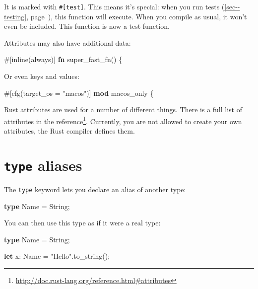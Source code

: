 \documentclass[a4paper,]{book}
\renewcommand*{\hypertarget}[3][\ar]{%
  \def\ar{#2}%
  \label{#1}%
  #3}
\renewcommand*{\hyperlink}[2]{%
 #2 (\autoref{#1}, page~\pageref{#1})}
\newenvironment{Shaded}{\begin{snugshade}}{\end{snugshade}}
\newcommand{\KeywordTok}[1]{\textcolor[rgb]{0.13,0.29,0.53}{\textbf{{#1}}}}
\newcommand{\DataTypeTok}[1]{\textcolor[rgb]{0.13,0.29,0.53}{{#1}}}
\newcommand{\StringTok}[1]{\textcolor[rgb]{0.31,0.60,0.02}{{#1}}}
\newcommand{\AttributeTok}[1]{\textcolor[rgb]{0.77,0.63,0.00}{{#1}}}
\newcommand{\NormalTok}[1]{{#1}}
\renewcommand{\href}[2]{#2\footnote{\url{#1}}}
\begin{document}
It is marked with \texttt{\#{[}test{]}}. This means it's special: when
you run \protect\hyperlink{sec--testing}{tests}, this function will
execute. When you compile as usual, it won't even be included. This
function is now a test function.

Attributes may also have additional data:

\begin{Shaded}
\begin{Highlighting}[]
\AttributeTok{#[}\NormalTok{inline}\AttributeTok{(}\NormalTok{always}\AttributeTok{)]}
\KeywordTok{fn} \NormalTok{super_fast_fn() \{}
\end{Highlighting}
\end{Shaded}

Or even keys and values:

\begin{Shaded}
\begin{Highlighting}[]
\AttributeTok{#[}\NormalTok{cfg}\AttributeTok{(}\NormalTok{target_os }\AttributeTok{=} \StringTok{"macos"}\AttributeTok{)]}
\KeywordTok{mod} \NormalTok{macos_only \{}
\end{Highlighting}
\end{Shaded}

Rust attributes are used for a number of different things. There is a
full list of attributes
\href{http://doc.rust-lang.org/reference.html\#attributes}{in the
reference}. Currently, you are not allowed to create your own
attributes, the Rust compiler defines them.

\hypertarget{sec--type-aliases}{\section{\texorpdfstring{\texttt{type}
aliases}{type aliases}}\label{sec--type-aliases}}

The \texttt{type} keyword lets you declare an alias of another type:

\begin{Shaded}
\begin{Highlighting}[]
\KeywordTok{type} \NormalTok{Name = }\DataTypeTok{String}\NormalTok{;}
\end{Highlighting}
\end{Shaded}

You can then use this type as if it were a real type:

\begin{Shaded}
\begin{Highlighting}[]
\KeywordTok{type} \NormalTok{Name = }\DataTypeTok{String}\NormalTok{;}

\KeywordTok{let} \NormalTok{x: Name = }\StringTok{"Hello"}\NormalTok{.to_string();}
\end{Highlighting}
\end{Shaded}
\end{document}
